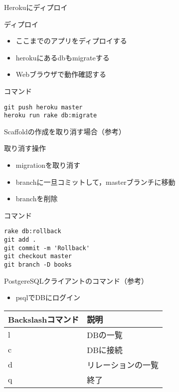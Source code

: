 \documentclass[t, aspectratio=169]{beamer}
\begin{document}
\begin{frame}[fragile,label=sec-7-1-6]{Herokuにディプロイ}
 \begin{block}{ディプロイ}
\begin{itemize}
\item ここまでのアプリをディプロイする
\item herokuにあるdbもmigrateする
\item Webブラウザで動作確認する
\end{itemize}
\end{block}

\begin{block}{コマンド}
\begin{verbatim}
git push heroku master
heroku run rake db:migrate
\end{verbatim}
\end{block}
\end{frame}
\begin{frame}[fragile,label=sec-7-1-7]{Scaffoldの作成を取り消す場合（参考）}
 \begin{block}{取り消す操作}
\begin{itemize}
\item migrationを取り消す
\item branchに一旦コミットして，masterブランチに移動
\item branchを削除
\end{itemize}
\end{block}

\begin{block}{コマンド}
\begin{verbatim}
rake db:rollback
git add .
git commit -m 'Rollback'
git checkout master
git branch -D books
\end{verbatim}
\end{block}
\end{frame}
\begin{frame}[label=sec-7-1-8]{PostgereSQLクライアントのコマンド（参考）}
\begin{itemize}
\item psqlでDBにログイン
\end{itemize}

\begin{center}
\begin{tabular}{ll}
Backslashコマンド & 説明\\
\hline
l & DBの一覧\\
c & DBに接続\\
d & リレーションの一覧\\
q & 終了\\
\end{tabular}
\end{center}
\end{frame}
\end{document}
